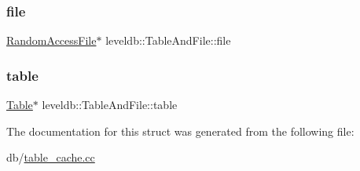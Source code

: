 \subsubsection{\texorpdfstring{file}{file}}
{\footnotesize\ttfamily \mbox{\hyperlink{classleveldb_1_1_random_access_file}{Random\+Access\+File}}$\ast$ leveldb\+::\+Table\+And\+File\+::file}

\mbox{\label{structleveldb_1_1_table_and_file_ab2df8b8a6c028cfcf36885fe76f48c99}} 
\subsubsection{\texorpdfstring{table}{table}}
{\footnotesize\ttfamily \mbox{\hyperlink{classleveldb_1_1_table}{Table}}$\ast$ leveldb\+::\+Table\+And\+File\+::table}



The documentation for this struct was generated from the following file\+:\begin{DoxyCompactItemize}
\item 
db/\mbox{\hyperlink{table__cache_8cc}{table\+\_\+cache.\+cc}}\end{DoxyCompactItemize}
